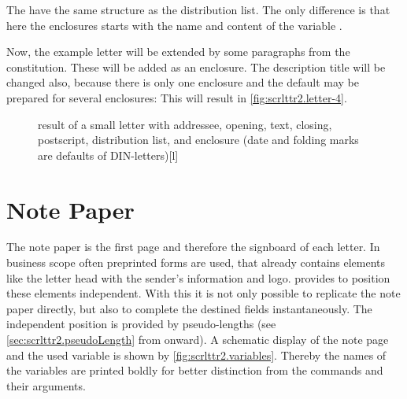 \begin{Declaration}
\end{Declaration}
The  have the same structure as the distribution list.
The only difference is that here the enclosures starts with the name
and content of the variable
.
\begin{Example}
  Now, the example letter will be extended by some paragraphs from the
  constitution. These will be added as an enclosure. The description title
  will be changed also, because there is only one enclosure and the default
  may be prepared for several enclosures:
  This will result in \autoref{fig:scrlttr2.letter-4}.
  \begin{figure}
    \setcapindent{0pt}%
    \begin{captionbeside}{%
        result of a small letter with addressee, opening, text, closing,
        postscript, distribution list, and enclosure
        (date and folding marks are defaults of DIN-letters)}[l]
    \end{captionbeside}
    \label{fig:scrlttr2.letter-4}
  \end{figure}
\end{Example}
%
\EndIndexGroup
%
\EndIndexGroup




\section{Note Paper}
\BeginIndexGroup
{}%

The note paper is the first page and therefore the signboard of each
letter. In business scope often preprinted forms are used, that already
contains elements like the letter head with the sender's information and
logo. \KOMAScript{} provides to position these elements independent. With this
it is not only possible to replicate the note paper directly, but also to
complete the destined fields instantaneously. The independent position is
provided by pseudo-lengths (see \autoref{sec:scrlttr2.pseudoLength} from
 onward). A schematic display of the
note page and the used variable is shown by
\autoref{fig:scrlttr2.variables}. Thereby the names of the variables are
printed boldly for better distinction from the commands and their arguments.

